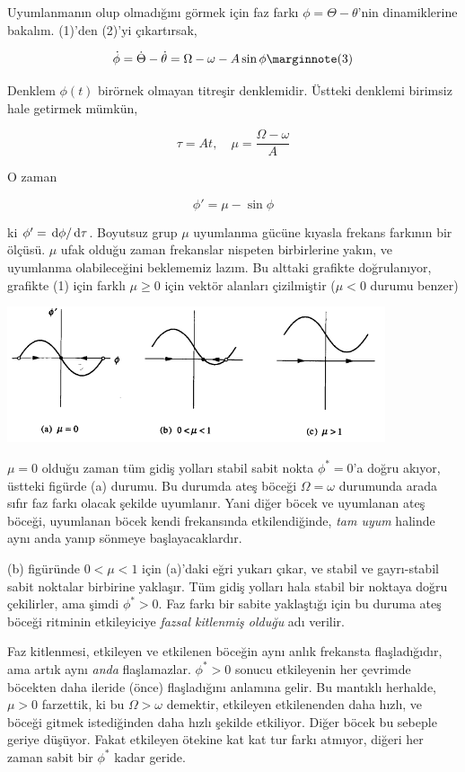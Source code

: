 \documentclass[12pt,fleqn]{article}\usepackage{../../common}
\begin{document}
Uyumlanmanın olup olmadığını görmek için faz farkı $\phi = \Theta - \theta$'nin
dinamiklerine bakalım. (1)'den (2)'yi çıkartırsak,

$$
\dot{\phi} = \dot{\Theta} - \dot{\theta} = \Omega - \omega - A\sin\phi
\mlabel{3}
$$

Denklem $\phi(t)$ birörnek olmayan titreşir denklemidir. Üstteki denklemi
birimsiz hale getirmek mümkün,

$$ \tau = At, \quad \mu = \frac{\Omega - \omega}{A} $$

O zaman

$$ \phi' = \mu - \sin\phi $$

ki $\phi' = \,\mathrm{d}\phi/\,\mathrm{d}\tau$. Boyutsuz grup $\mu$ uyumlanma gücüne kıyasla
frekans farkının bir ölçüsü. $\mu$ ufak olduğu zaman frekanslar nispeten
birbirlerine yakın, ve uyumlanma olabileceğini beklememiz lazım. Bu alttaki
grafikte doğrulanıyor, grafikte (1) için farklı $\mu \ge 0$ için vektör alanları
çizilmiştir ($\mu < 0$ durumu benzer)

\includegraphics[height=4cm]{04_15.png}

$\mu=0$ olduğu zaman tüm gidiş yolları stabil sabit nokta $\phi^*=0$'a doğru
akıyor, üstteki figürde (a) durumu. Bu durumda ateş böceği $\Omega=\omega$
durumunda arada sıfır faz farkı olacak şekilde uyumlanır. Yani diğer böcek ve
uyumlanan ateş böceği, uyumlanan böcek kendi frekansında etkilendiğinde, {\em
  tam uyum} halinde aynı anda yanıp sönmeye başlayacaklardır.

(b) figüründe $0 < \mu < 1$ için (a)'daki eğri yukarı çıkar, ve stabil ve
gayrı-stabil sabit noktalar birbirine yaklaşır. Tüm gidiş yolları hala stabil
bir noktaya doğru çekilirler, ama şimdi $\phi^*>0$. Faz farkı bir sabite
yaklaştığı için bu duruma ateş böceği ritminin etkileyiciye {\em fazsal kitlenmiş
  olduğu} adı verilir.

Faz kitlenmesi, etkileyen ve etkilenen böceğin aynı anlık frekansta
flaşladığıdır, ama artık aynı {\em anda} flaşlamazlar. $\phi^*>0$ sonucu
etkileyenin her çevrimde böcekten daha ileride (önce) flaşladığını anlamına
gelir. Bu mantıklı herhalde, $\mu>0$ farzettik, ki bu $\Omega > \omega$
demektir, etkileyen etkilenenden daha hızlı, ve böceği gitmek istediğinden daha
hızlı şekilde etkiliyor. Diğer böcek bu sebeple geriye düşüyor. Fakat etkileyen
ötekine kat kat tur farkı atmıyor, diğeri her zaman sabit bir $\phi^*$ kadar
geride.
\end{document}
